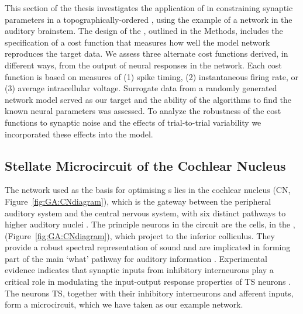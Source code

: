 \smallskip{} 

This section of the thesis investigates the application of {\GAs} in
constraining synaptic parameters in a topographically-ordered {\BNN},
using the example of a network in the auditory brainstem. The design
of the {\GA}, outlined in the Methods, includes the specification of a
cost function that measures how well the model network reproduces the
target data. We assess three alternate cost functions derived, in
different ways, from the output of neural responses in the
network. Each cost function is based on measures of (1) spike timing,
(2) instantaneous firing rate, or (3) average intracellular
voltage. Surrogate data from a randomly generated network model served
as our target and the ability of the algorithms to find the known
neural parameters was assessed. To analyze the robustness of the cost
functions to synaptic noise and the effects of trial-to-trial
variability we incorporated these effects into the model.

\subsection{Stellate Microcircuit of the Cochlear
  Nucleus}\label{sec:GA:stell-micr-cochl}

The network used as the basis for optimising {\BNN}s lies in the cochlear
nucleus (CN, Figure~\ref{fig:GA:CNdiagram}), which is the gateway
between the peripheral auditory system and the central nervous system,
with six distinct pathways to higher auditory nuclei
\citep{CantBenson:2003}. The principle neurons in the circuit are the
\TS cells, in the \VCN,
(Figure~\ref{fig:GA:CNdiagram}), which project to the inferior
colliculus.  They provide a robust spectral representation of sound
and are implicated in forming part of the main `what' pathway for
auditory information \citep{YoungOertel:2004}. Experimental evidence
indicates that synaptic inputs from inhibitory interneurons play a
critical role in modulating the input-output response properties of TS
neurons
\citep{FerragamoGoldingEtAl:1998,NeedhamPaolini:2006,PaoliniClareyEtAl:2005}.
The neurons TS, together with their inhibitory interneurons and
afferent inputs, form a microcircuit, which we have taken as our
example network.


